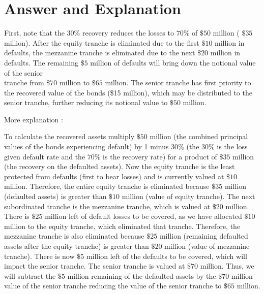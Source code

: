 \documentclass[11pt]{article}
\begin{document}
\section*{Answer and Explanation}
First, note that the $30 \%$ recovery reduces the losses to $70 \%$ of $\$ 50$ million ( $\$ 35$ million). After the equity tranche is eliminated due to the first $\$ 10$ million in defaults, the mezzanine tranche is eliminated due to the next $\$ 20$ million in defaults. The remaining $\$ 5$ million of defaults will bring down the notional value of the senior\\
tranche from $\$ 70$ million to $\$ 65$ million. The senior tranche has first priority to the recovered value of the bonds (\$15 million), which may be distributed to the senior tranche, further reducing its notional value to $\$ 50$ million.

More explanation :

To calculate the recovered assets multiply $\$ 50$ million (the combined principal values of the bonds experiencing default) by 1 minus $30 \%$ (the $30 \%$ is the loss given default rate and the $70 \%$ is the recovery rate) for a product of $\$ 35$ million (the recovery on the defaulted assets). Now the equity tranche is the least protected from defaults (first to bear losses) and is currently valued at $\$ 10$ million. Therefore, the entire equity tranche is eliminated because $\$ 35$ million (defaulted assets) is greater than $\$ 10$ million (value of equity tranche). The next subordinated tranche is the mezzanine tranche, which is valued at $\$ 20$ million. There is $\$ 25$ million left of default losses to be covered, as we have allocated $\$ 10$ million to the equity tranche, which eliminated that tranche. Therefore, the mezzanine tranche is also eliminated because $\$ 25$ million (remaining defaulted assets after the equity tranche) is greater than $\$ 20$ million (value of mezzanine tranche). There is now $\$ 5$ million left of the defaults to be covered, which will impact the senior tranche. The senior tranche is valued at $\$ 70$ million. Thus, we will subtract the $\$ 5$ million remaining of the defaulted assets by the $\$ 70$ million value of the senior tranche reducing the value of the senior tranche to $\$ 65$ million.
\end{document}

